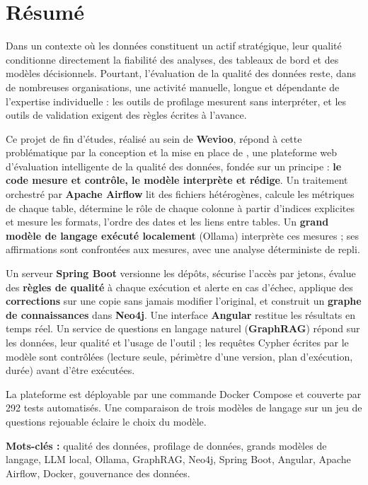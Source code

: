 \chapter*{Résumé}

Dans un contexte où les données constituent un actif stratégique, leur qualité conditionne directement la fiabilité des analyses, des tableaux de bord et des modèles décisionnels. Pourtant, l'évaluation de la qualité des données reste, dans de nombreuses organisations, une activité manuelle, longue et dépendante de l'expertise individuelle : les outils de profilage mesurent sans interpréter, et les outils de validation exigent des règles écrites à l'avance.

Ce projet de fin d'études, réalisé au sein de \textbf{Wevioo}, répond à cette problématique par la conception et la mise en place de \textbf{\projet}, une plateforme web d'évaluation intelligente de la qualité des données, fondée sur un principe : \textbf{le code mesure et contrôle, le modèle interprète et rédige}. Un traitement orchestré par \textbf{Apache Airflow} lit des fichiers hétérogènes, calcule les métriques de chaque table, détermine le rôle de chaque colonne à partir d'indices explicites et mesure les formats, l'ordre des dates et les liens entre tables. Un \textbf{grand modèle de langage exécuté localement} (Ollama) interprète ces mesures ; ses affirmations sont confrontées aux mesures, avec une analyse déterministe de repli.

Un serveur \textbf{Spring Boot} versionne les dépôts, sécurise l'accès par jetons, évalue des \textbf{règles de qualité} à chaque exécution et alerte en cas d'échec, applique des \textbf{corrections} sur une copie sans jamais modifier l'original, et construit un \textbf{graphe de connaissances} dans \textbf{Neo4j}. Une interface \textbf{Angular} restitue les résultats en temps réel. Un service de questions en langage naturel (\textbf{GraphRAG}) répond sur les données, leur qualité et l'usage de l'outil ; les requêtes Cypher écrites par le modèle sont contrôlées (lecture seule, périmètre d'une version, plan d'exécution, durée) avant d'être exécutées.

La plateforme est déployable par une commande Docker Compose et couverte par 292 tests automatisés. Une comparaison de trois modèles de langage sur un jeu de questions rejouable éclaire le choix du modèle.

\vspace{0.4cm}
\noindent\textbf{Mots-clés :} qualité des données, profilage de données, grands modèles de langage, LLM local, Ollama, GraphRAG, Neo4j, Spring Boot, Angular, Apache Airflow, Docker, gouvernance des données.

